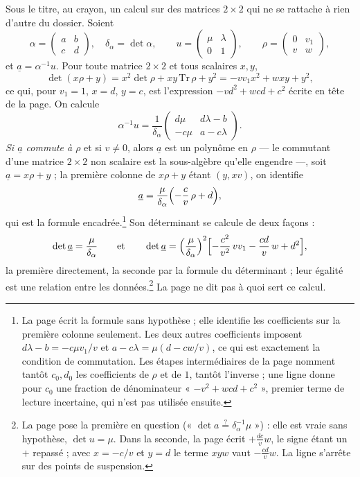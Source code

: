 \documentclass[11pt,a4paper]{article}
\begin{document}
Sous le titre, au crayon, un calcul sur des matrices $2 \times 2$ qui ne se
rattache à rien d'autre du dossier. Soient
\[
\alpha = \begin{pmatrix} a & b \\ c & d \end{pmatrix}, \quad
\delta_\alpha = \det\alpha, \qquad
u = \begin{pmatrix} \mu & \lambda \\ 0 & 1 \end{pmatrix}, \qquad
\rho = \begin{pmatrix} 0 & v_1 \\ v & w \end{pmatrix},
\]
et $\underline{a} = \alpha^{-1}u$. Pour toute matrice $2 \times 2$ et tous
scalaires $x, y$,
\[
\det(x\rho + y) = x^2 \det\rho + xy\,\mathrm{Tr}\,\rho + y^2
= -v v_1 x^2 + w xy + y^2 ,
\]
ce qui, pour $v_1 = 1$, $x = d$, $y = c$, est l'expression $-vd^2 + wcd + c^2$
écrite en tête de la page. On calcule
\[
\alpha^{-1}u = \frac{1}{\delta_\alpha}
\begin{pmatrix} d\mu & d\lambda - b \\ -c\mu & a - c\lambda \end{pmatrix} .
\]
\emph{Si $\underline{a}$ commute à $\rho$} et si $v \neq 0$, alors $\underline{a}$
est un polynôme en $\rho$ — le commutant d'une matrice $2 \times 2$ non scalaire
est la sous-algèbre qu'elle engendre —, soit $\underline{a} = x\rho + y$ ; la
première colonne de $x\rho + y$ étant $(y, xv)$, on identifie
\[
\underline{a} = \frac{\mu}{\delta_\alpha}\Bigl(-\frac{c}{v}\,\rho + d\Bigr) ,
\]
qui est la formule encadrée.\footnote{La page écrit la formule sans hypothèse ;
elle identifie les coefficients sur la première colonne seulement. Les deux
autres coefficients imposent $d\lambda - b = -c\mu v_1/v$ et
$a - c\lambda = \mu(d - cw/v)$, ce qui est exactement la condition de
commutation. Les étapes intermédiaires de la page nomment tantôt $c_0, d_0$ les
coefficients de $\rho$ et de $1$, tantôt l'inverse ; une ligne donne pour $c_0$
une fraction de dénominateur « $-v^2 + wcd + c^2$ », premier terme de lecture
incertaine, qui n'est pas utilisée ensuite.} Son déterminant se calcule de deux
façons :
\[
\det \underline{a} = \frac{\mu}{\delta_\alpha}
\qquad\text{et}\qquad
\det \underline{a} = \Bigl(\frac{\mu}{\delta_\alpha}\Bigr)^{2}
\Bigl[-\frac{c^2}{v^2}\,v v_1 - \frac{cd}{v}\,w + d^2\Bigr] ,
\]
la première directement, la seconde par la formule du déterminant ; leur égalité
est une relation entre les données.\footnote{La page pose la première en question
(« $\det a \overset{?}{=} \delta_\alpha^{-1}\mu$ ») : elle est vraie sans
hypothèse, $\det u = \mu$. Dans la seconde, la page écrit $+\frac{dc}{v}w$, le
signe étant un $+$ repassé ; avec $x = -c/v$ et $y = d$ le terme $xyw$ vaut
$-\frac{cd}{v}w$. La ligne s'arrête sur des points de suspension.} La page ne dit
pas à quoi sert ce calcul.
\end{document}
